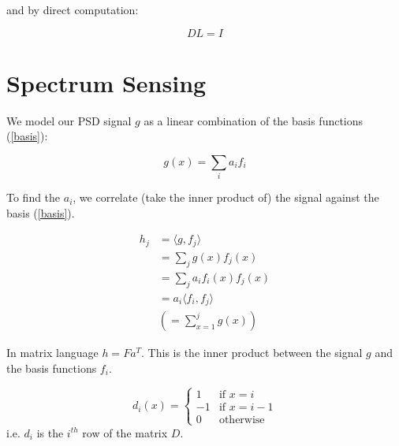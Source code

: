 \documentclass{article}
\begin{document}
and by direct computation:

\begin{equation}
DL = I
\label{Dinv}
\end{equation}

\section{Spectrum Sensing}

We model our PSD signal \(g\) as a linear combination of the basis functions (\ref{basis}):

\begin{equation}
g\left(x\right) = \sum_i a_i f_i 
\label{basis-expansion}
\end{equation}

To find the \(a_i\), we correlate (take the inner product of) the signal against the basis (\ref{basis}).

\begin{definition}
\begin{align}
h_j &= \langle g, f_j \rangle \\
&= \sum_j g\left(x\right) f_j\left(x\right) \\
&= \sum_j a_i f_i\left(x\right) f_j\left(x\right) \\
&= a_i \langle f_i, f_j\rangle \\
&\left(= \sum_{x=1}^j g\left(x\right)\right)
\end{align}

In matrix language \(h = F a^T\). This is the inner product between the signal \(g\) and the basis functions \(f_i\).
\end{definition}

\begin{definition}
\begin{equation}
d_i\left(x\right) =
\begin{cases}
1 & \text{if } x = i \\
-1 & \text{if } x = i-1 \\
0 & \text{otherwise} 
\end{cases}
\end{equation}
i.e. \(d_i\) is the \(i^{th}\) row of the matrix \(D\).
\end{definition}
\end{document}
